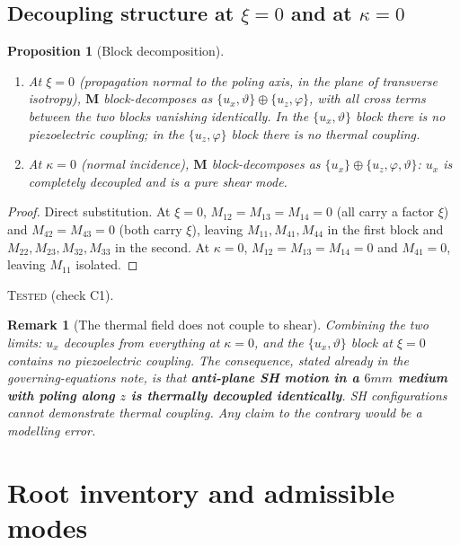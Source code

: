 \documentclass[11pt]{article}
\newcommand{\bth}{\vartheta}
\theoremstyle{plain}
\newtheorem{proposition}{Proposition}
\newtheorem{remark}{Remark}
\begin{document}
\subsection{Decoupling structure at $\xi=0$ and at $\kappa=0$}

\begin{proposition}[Block decomposition]
\label{prop:blocks}
\begin{enumerate}
  \item At $\xi=0$ (propagation normal to the poling axis, in the plane of
        transverse isotropy), $\bm{M}$ block-decomposes as
        $\{u_x,\bth\}\oplus\{u_z,\varphi\}$, with all cross terms between the two
        blocks vanishing identically. In the $\{u_x,\bth\}$ block there is
        \emph{no} piezoelectric coupling; in the $\{u_z,\varphi\}$ block there is
        \emph{no} thermal coupling.
  \item At $\kappa=0$ (normal incidence), $\bm{M}$ block-decomposes as
        $\{u_x\}\oplus\{u_z,\varphi,\bth\}$: $u_x$ is completely decoupled and is a
        pure shear mode.
\end{enumerate}
\end{proposition}
\begin{proof}
Direct substitution. At $\xi=0$, $M_{12}=M_{13}=M_{14}=0$ (all carry a factor
$\xi$) and $M_{42}=M_{43}=0$ (both carry $\xi$), leaving $M_{11},M_{41},M_{44}$
in the first block and $M_{22},M_{23},M_{32},M_{33}$ in the second. At
$\kappa=0$, $M_{12}=M_{13}=M_{14}=0$ and $M_{41}=0$, leaving $M_{11}$ isolated.
\end{proof}
\textsc{Tested} (check C1).

\begin{remark}[The thermal field does not couple to shear]
\label{rem:sh}
Combining the two limits: $u_x$ decouples from everything at $\kappa=0$, and the
$\{u_x,\bth\}$ block at $\xi=0$ contains no piezoelectric coupling. The
consequence, stated already in the governing-equations note, is that
\textbf{anti-plane SH motion in a $6mm$ medium with poling along $z$ is thermally
decoupled identically}. SH configurations cannot demonstrate thermal coupling.
Any claim to the contrary would be a modelling error.
\end{remark}

\section{Root inventory and admissible modes}
\label{sec:roots}
\end{document}

